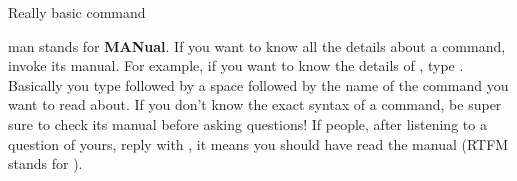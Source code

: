 \begin{frame}{Really basic command}

	\begin{block}{man}
		 stands for \textbf{MANual}. If you want to know all the details about a command, invoke its manual. For example, if you want to know the details of , type . Basically you type  followed by a space followed by the name of the command you want to read about. If you don't know the exact syntax of a command, be super sure to check its manual before asking questions! If people, after listening to a question of yours, reply with , it means you should have read the manual (RTFM stands for ).
	\end{block}
	
\end{frame}

